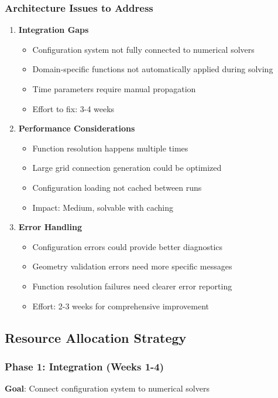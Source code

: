 \subsubsection{Architecture Issues to Address}
\begin{enumerate}
    \item \textbf{Integration Gaps}
    \begin{itemize}
        \item Configuration system not fully connected to numerical solvers
        \item Domain-specific functions not automatically applied during solving
        \item Time parameters require manual propagation
        \item Effort to fix: 3-4 weeks
    \end{itemize}
    
    \item \textbf{Performance Considerations}
    \begin{itemize}
        \item Function resolution happens multiple times
        \item Large grid connection generation could be optimized
        \item Configuration loading not cached between runs
        \item Impact: Medium, solvable with caching
    \end{itemize}
    
    \item \textbf{Error Handling}
    \begin{itemize}
        \item Configuration errors could provide better diagnostics
        \item Geometry validation errors need more specific messages
        \item Function resolution failures need clearer error reporting
        \item Effort: 2-3 weeks for comprehensive improvement
    \end{itemize}
\end{enumerate}

\subsection{Resource Allocation Strategy}

\subsubsection{Phase 1: Integration (Weeks 1-4)}
\textbf{Goal}: Connect configuration system to numerical solvers

